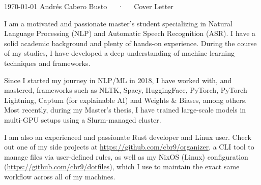 \documentclass[11pt, a4paper]{awesome-cv}
\begin{document}
\makecvheader[R]

\makecvfooter
  {\today}
  {Andrés Cabero Busto~~~·~~~Cover Letter}
  {}

\makelettertitle

\begin{cvletter}

I am a motivated and passionate master's student specializing in Natural Language Processing (NLP) and Automatic Speech Recognition (ASR). I have a solid academic background and plenty of hands-on experience. During the course of my studies, I have developed a deep understanding of machine learning techniques and frameworks. 

Since I started my journey in NLP/ML in 2018, I have worked with, and mastered, frameworks such as NLTK, Spacy, HuggingFace, PyTorch, PyTorch Lightning, Captum (for explainable AI) and Weights \& Biases, among others. Most recently, during my Master's thesis, I have trained large-scale models in multi-GPU setups using a Slurm-managed cluster.

I am also an experienced and passionate Rust developer and Linux user. Check out one of my side projects at \url{https://github.com/cbr9/organizer}, a CLI tool to manage files via user-defined rules, as well as my NixOS (Linux) configuration (\url{https://github.com/cbr9/dotfiles}), which I use to maintain the exact same workflow across all of my machines.



\end{cvletter}
\end{document}
